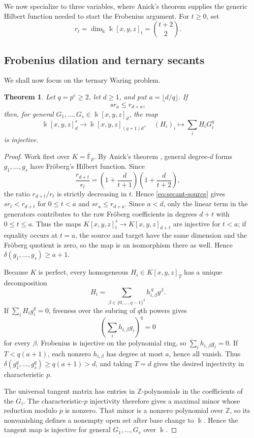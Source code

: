 \documentclass[11pt]{amsart}
\newtheorem{theorem}{Theorem}[section]
\theoremstyle{remark}
\newcommand{\kk}{\Bbbk}
\newcommand{\ZZ}{\mathbb Z}
\begin{document}
We now specialize to three variables, where Anick's theorem supplies the generic Hilbert function needed to start the Frobenius argument. For $t\ge0$, set
$$
r_t=\dim_{\kk}\kk[x,y,z]_t=\binom{t+2}{2}.
$$

\subsection{Frobenius dilation and ternary secants}\label{subsec:secant-powers}

We shall now focus on the ternary Waring problem.

\begin{theorem}\label{thm:secant-tangent}
Let $q=p^e\ge2$, let $d\ge1$, and put $a=\lfloor d/q\rfloor$. If
\begin{equation}\label{eq:secant-source}
s r_a\le r_{d+a},
\end{equation}
then, for general $G_1,\ldots,G_s\in \kk[x,y,z]_d$, the map
$$
\kk[x,y,z]_d^s\longrightarrow \kk[x,y,z]_{(q+1)d},
\quad
(H_i)_i\longmapsto\sum_i H_iG_i^q
$$
is injective.
\end{theorem}

\begin{proof}
Work first over $K=\overline{\mathbb F}_p$. By Anick's theorem \cite{Anick}, general degree-$d$ forms $g_1,\ldots,g_s$ have Fr\"oberg's Hilbert function. Since
$$
\frac{r_{d+t}}{r_t}
=
\left(1+\frac{d}{t+1}\right)
\left(1+\frac{d}{t+2}\right),
$$
the ratio $r_{d+t}/r_t$ is strictly decreasing in $t$. Hence \eqref{eq:secant-source} gives $sr_t<r_{d+t}$ for $0\le t<a$ and $sr_a\le r_{d+a}$. Since $a<d$, only the linear term in the generators contributes to the raw Fr\"oberg coefficients in degrees $d+t$ with $0\le t\le a$. Thus the maps $K[x,y,z]_t^s\to K[x,y,z]_{d+t}$ are injective for $t<a$; if equality occurs at $t=a$, the source and target have the same dimension and the Fr\"oberg quotient is zero, so the map is an isomorphism there as well. Hence $\delta(g_1,\ldots,g_s)\ge a+1$.

Because $K$ is perfect, every homogeneous $H_i\in K[x,y,z]_T$ has a unique decomposition
$$
H_i=\sum_{\beta\in\{0,\ldots,q-1\}^3}h_{i,\beta}^{\,q}y^\beta.
$$
If $\sum_iH_ig_i^q=0$, freeness over the subring of $q$th powers gives
$$
\left(\sum_i h_{i,\beta}g_i\right)^q=0
$$
for every $\beta$. Frobenius is injective on the polynomial ring, so $\sum_i h_{i,\beta}g_i=0$. If $T<q(a+1)$, each nonzero $h_{i,\beta}$ has degree at most $a$, hence all vanish. Thus $\delta(g_1^q,\ldots,g_s^q)\ge q(a+1)>d$, and taking $T=d$ gives the desired injectivity in characteristic $p$.

The universal tangent matrix has entries in $\ZZ$-polynomials in the coefficients of the $G_i$. The characteristic-$p$ injectivity therefore gives a maximal minor whose reduction modulo $p$ is nonzero. That minor is a nonzero polynomial over $\ZZ$, so its nonvanishing defines a nonempty open set after base change to $\kk$. Hence the tangent map is injective for general $G_1,\ldots,G_s$ over $\kk$.
\end{proof}
\end{document}
